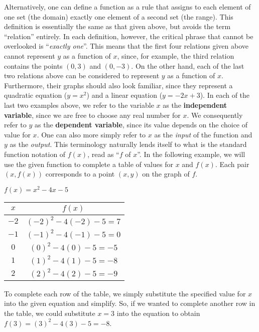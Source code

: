 Alternatively, one can define a function as a rule that assigns to each element of one set (the domain) exactly one element of a second set (the range).  This definition is essentially the same as that given above, but avoids the term ``relation'' entirely.  In each definition, however, the critical phrase that cannot be overlooked is ``\textit{exactly one}''.  This means that the first four relations given above cannot represent $y$ as a function of $x$, since, for example, the third relation contains the points $(0,3)$ and $(0,-3)$.  On the other hand, each of the last two relations above can be considered to represent $y$ as a function of $x$.  Furthermore, their graphs should also look familiar, since they represent a quadratic equation ($y=x^2$) and a linear equation ($y=-2x+3$).\pp
In each of the last two examples above, we refer to the variable $x$ as the {\bf independent variable}, since we are free to choose any real number for $x$.  We consequently refer to $y$ as the {\bf dependent variable}, since its value depends on the choice of value for $x$.  One can also more simply refer to $x$ as the \textit{input} of the function and $y$ as the \textit{output}.  This terminology naturally lends itself to what is the standard function notation of $f(x)$, read as ``$f$ of $x$''.  In the following example, we will use the given function to complete a table of values for $x$ and $f(x)$.  Each pair $(x,f(x))$ corresponds to a point $(x,y)$ on the graph of $f$.\par

\begin{example} $f(x)=x^2-4x-5$
\begin{center}
\begin{tabular}{c|c}
	$x$ & $f(x)$\\
	\hline
	$-2$ & $(-2)^2-4(-2)-5=7$\\
	\hline
	$-1$ & $(-1)^2-4(-1)-5=0$\\
	\hline
	$0$ & $(0)^2-4(0)-5=-5$\\
	\hline
	$1$ & $(1)^2-4(1)-5=-8$\\
	\hline
	$2$ & $(2)^2-4(2)-5=-9$
\end{tabular}
\end{center}
\end{example}

To complete each row of the table, we simply substitute the specified value for $x$ into the given equation and simplify.  So, if we wanted to complete another row in the table, we could substitute $x=3$ into the equation to obtain $f(3)=(3)^2-4(3)-5=-8$.
\newpage

